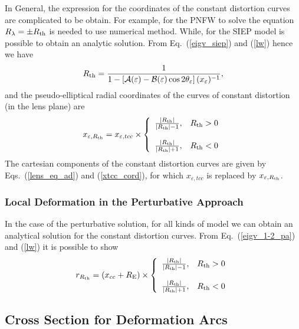 \documentclass[useAMS,usenatbib]{mn2e}
\begin{document}
In General, the expression for the coordinates of the constant distortion curves are complicated to be obtain. For example, for the PNFW to solve the equation $R_\lambda=\pm R_{\rm th}$ is needed to use numerical method. While, for the SIEP model is possible to obtain an analytic solution.
From Eq.~(\ref{eigv_siep}) and (\ref{lw}) hence we have
\begin{equation}
R_{\rm th}=\frac{1}{1-\left[\mathcal{A}(\varepsilon)-\mathcal{B}(\varepsilon)\cos{2\theta_\varepsilon } \right](x_\varepsilon)^{-1}},
\end{equation}
and the pseudo-elliptical radial coordinates of the curves of constant distortion (in the lens plane) are
\begin{equation}
x_{\varepsilon,R_{\rm th}}=x_{\varepsilon,tcc}\times\left\{\begin{array}{cc} \frac{|R_{\rm th}|}{|R_{\rm th}|-1}, & R_{\rm th}>0 \\ & \\
\frac{|R_{\rm th}|}{|R_{\rm th}|+1}, & R_{\rm th}<0 \end{array}\right.
\end{equation}
The cartesian components of the constant distortion curves are given by Eqs.~(\ref{lens_eq_ad}) and (\ref{xtcc_cord}), for which $x_{\varepsilon,tcc}$ is replaced by $x_{\varepsilon,R_{\rm th}}$.

 \subsubsection{Local Deformation in the Perturbative Approach}
 In the case of the perturbative solution, for all kinds of model we can obtain an analytical solution for the constant distortion curves. From Eq.~(\ref{eigv_1-2_pa}) and (\ref{lw}) it is possible to show
\begin{equation}
r_{R_{\rm th}}=(x_{cc}+R_{\rm E})\times\left\{\begin{array}{cc} \frac{|R_{\rm th}|}{|R_{\rm th}|-1}, & R_{\rm th}>0 \\ & \\
\frac{|R_{\rm th}|}{|R_{\rm th}|+1}, & R_{\rm th}<0 \end{array}\right.
\end{equation}

\subsection{Cross Section for Deformation Arcs}
\end{document}
